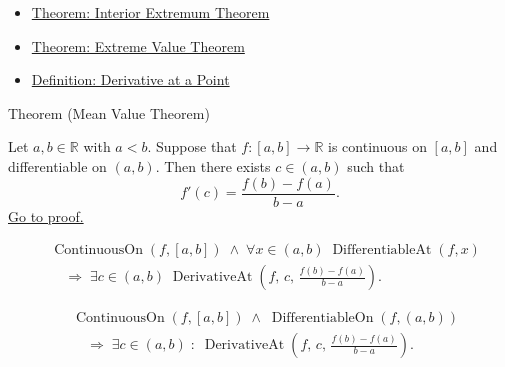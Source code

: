 \begin{dependencies}
\begin{itemize}
  \item \hyperref[thm:interior-extremum-theorem]{Theorem: Interior Extremum Theorem}
  \item \hyperref[thm:extreme-value-theorem]{Theorem: Extreme Value Theorem}
  \item \hyperref[def:derivative-at-a-point]{Definition: Derivative at a Point}
\end{itemize}
\end{dependencies}




\begin{theorembox}{Theorem (Mean Value Theorem)}
\begin{theorem}
\label{thm:mean-value-theorem}
Let $a, b \in \mathbb{R}$ with $a < b$. Suppose that $f : [a,b] \to \mathbb{R}$ is continuous on $[a,b]$ and differentiable on $(a,b)$. Then there exists $c \in (a,b)$ such that
\[
f'(c) = \frac{f(b) - f(a)}{b - a}.
\]
\hyperref[prf:mean-value-theorem]{Go to proof.}
\end{theorem}
\end{theorembox}

\begin{remark*}
\begin{align*}
&\operatorname{ContinuousOn}(f,[a,b])
\;\land\;
\forall x \in (a,b)\;\operatorname{DifferentiableAt}(f,x)\\
&\quad\Rightarrow\;
\exists c \in (a,b)\;
\operatorname{DerivativeAt}\!\left(f,\,c,\,\tfrac{f(b)-f(a)}{b-a}\right).
\end{align*}
\end{remark*}

\begin{remark*}
\begin{align*}
&\operatorname{ContinuousOn}(f,[a,b])
\;\land\;
\operatorname{DifferentiableOn}(f,(a,b))\\
&\quad\Longrightarrow\;
\exists c\in(a,b)\;:\;
\operatorname{DerivativeAt}\!\left(f,\,c,\,\tfrac{f(b)-f(a)}{b-a}\right).
\end{align*}
\end{remark*}


